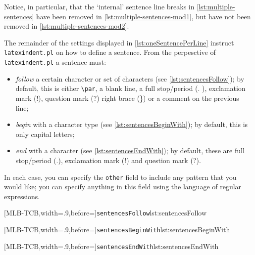 	Notice, in particular, that the `internal' sentence line breaks in \cref{lst:multiple-sentences} have been removed in \cref{lst:multiple-sentences-mod1}, but have not been removed in \cref{lst:multiple-sentences-mod2}.

	The remainder of the settings displayed in \vref{lst:oneSentencePerLine} instruct \texttt{latexindent.pl} on how to define a sentence.
	From the perpesctive of \texttt{latexindent.pl} a sentence must: \begin{itemize} \item \emph{follow} a certain character or set of characters (see \cref{lst:sentencesFollow}); by default, this is either \lstinline!\par!, a blank line, a full stop/period (.
		      ), exclamation mark (!), question mark (?) right brace (\}) or a comment
		      on the previous line;
		\item \emph{begin} with a character type (see \cref{lst:sentencesBeginWith}); by default, this is only capital letters;
		\item \emph{end} with a character (see \cref{lst:sentencesEndWith}); by default, these are
		      full stop/period (.), exclamation mark (!) and question mark (?).
	\end{itemize}
	In each case, you can specify the \texttt{other} field to include any pattern that you would like; you can specify anything in this field using the language of regular expressions.

	\begin{adjustwidth}{-3.5cm}{-2.5cm}
		\begin{minipage}{.36\linewidth}
			[MLB-TCB,width=.9\linewidth,before=\centering]{\texttt{sentencesFollow}}{lst:sentencesFollow}
		\end{minipage}
		\hfill
		\begin{minipage}{.31\linewidth}
			[MLB-TCB,width=.9\linewidth,before=\centering]{\texttt{sentencesBeginWith}}{lst:sentencesBeginWith}
		\end{minipage}
		\hfill
		\begin{minipage}{.31\linewidth}
			[MLB-TCB,width=.9\linewidth,before=\centering]{\texttt{sentencesEndWith}}{lst:sentencesEndWith}
		\end{minipage}
	\end{adjustwidth}

